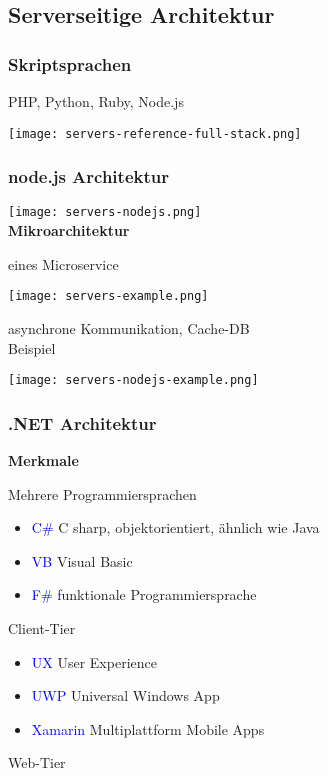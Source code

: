 \subsection{Serverseitige Architektur}

\subsubsection{Skriptsprachen}

PHP, Python, Ruby, Node.js

\texttt{[image: servers-reference-full-stack.png]} \\

\subsubsection{node.js Architektur}

\texttt{[image: servers-nodejs.png]} \\

\textbf{Mikroarchitektur}

eines Microservice

\texttt{[image: servers-example.png]}

asynchrone Kommunikation, Cache-DB \\

\columnbreak
Beispiel

\texttt{[image: servers-nodejs-example.png]}

\subsubsection{.NET Architektur}

\textbf{Merkmale}

Mehrere Programmiersprachen

\begin{itemize}
    \item \textcolor{blue}{C\#} C sharp, objektorientiert, ähnlich wie Java
    \item \textcolor{blue}{VB} Visual Basic
    \item \textcolor{blue}{F\#} funktionale Programmiersprache
\end{itemize}
\vspace{10pt}
Client-Tier

\begin{itemize}
    \item \textcolor{blue}{UX} User Experience
    \item \textcolor{blue}{UWP} Universal Windows App
    \item \textcolor{blue}{Xamarin} Multiplattform Mobile Apps
\end{itemize}
\vspace{10pt}
Web-Tier

